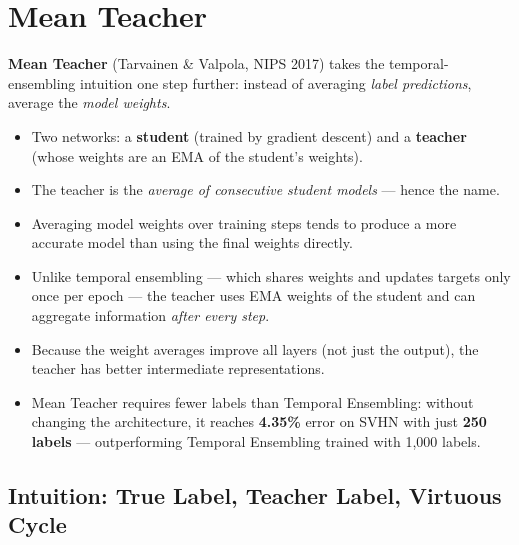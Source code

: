\documentclass[11pt,a4paper]{article}
\theoremstyle{definition}
\theoremstyle{plain}
\theoremstyle{remark}
\begin{document}
\section{Mean Teacher}

\textbf{Mean Teacher} (Tarvainen \& Valpola, NIPS 2017) takes the temporal-ensembling intuition one step further: instead of averaging \emph{label predictions}, average the \emph{model weights}.

\begin{itemize}
    \item Two networks: a \textbf{student} (trained by gradient descent) and a \textbf{teacher} (whose weights are an EMA of the student's weights).
    \item The teacher is the \emph{average of consecutive student models} --- hence the name.
    \item Averaging model weights over training steps tends to produce a more accurate model than using the final weights directly.
    \item Unlike temporal ensembling --- which shares weights and updates targets only once per epoch --- the teacher uses EMA weights of the student and can aggregate information \emph{after every step}.
    \item Because the weight averages improve all layers (not just the output), the teacher has better intermediate representations.
    \item Mean Teacher requires fewer labels than Temporal Ensembling: without changing the architecture, it reaches \textbf{4.35\%} error on SVHN with just \textbf{250 labels} --- outperforming Temporal Ensembling trained with 1{,}000 labels.
\end{itemize}

\subsection{Intuition: True Label, Teacher Label, Virtuous Cycle}
\end{document}
